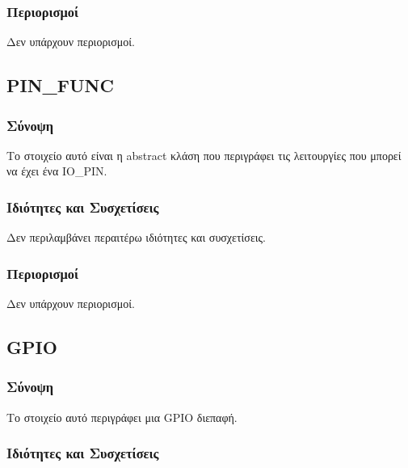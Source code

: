 \subsubsection*{Περιορισμοί}

\noindent Δεν υπάρχουν περιορισμοί.

\subsection{PIN\_FUNC}
\label{subsec:pin_func}

\subsubsection*{Σύνοψη}

\noindent Το στοιχείο αυτό είναι η abstract κλάση που περιγράφει τις λειτουργίες που μπορεί να έχει ένα IO\_PIN.

\subsubsection*{Ιδιότητες και Συσχετίσεις}

\noindent Δεν περιλαμβάνει περαιτέρω ιδιότητες και συσχετίσεις.

\subsubsection*{Περιορισμοί}

\noindent Δεν υπάρχουν περιορισμοί.

\subsection{GPIO}
\label{subsec:gpio}

\subsubsection*{Σύνοψη}

\noindent Το στοιχείο αυτό περιγράφει μια GPIO διεπαφή.

\subsubsection*{Ιδιότητες και Συσχετίσεις}

